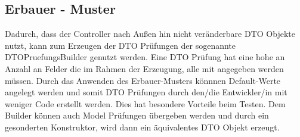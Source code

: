 \subsection{Erbauer - Muster}
Dadurch, dass der Controller nach Außen hin nicht veränderbare DTO Objekte nutzt,
kann zum Erzeugen der DTO Prüfungen der sogenannte DTOPruefungsBuilder genutzt werden.
Eine DTO Prüfung hat eine hohe an Anzahl an Felder die im Rahmen der Erzeugung, alle mit angegeben werden müssen.
Durch das Anwenden des Erbauer-Musters könnnen Default-Werte angelegt werden und somit DTO Prüfungen durch den/die Entwickler/in
mit weniger Code erstellt werden.
Dies hat besondere Vorteile beim Testen.
Dem Builder können auch Model Prüfungen übergeben werden und durch ein gesonderten Konstruktor,
wird dann ein äquivalentes DTO Objekt erzeugt.